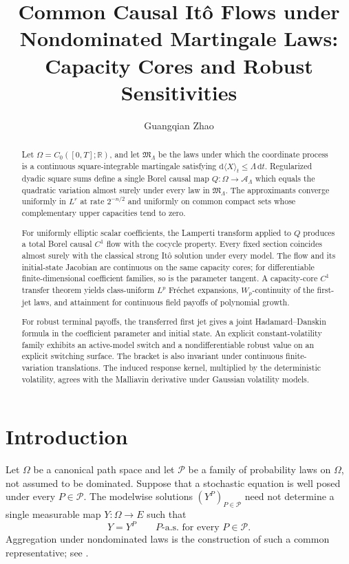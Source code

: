 \documentclass[11pt,reqno]{amsart}
\title[Common causal It\^o flows]
{Common Causal It\^o Flows under Nondominated Martingale Laws:\\
Capacity Cores and Robust Sensitivities}
\author{Guangqian Zhao}
\theoremstyle{plain}
\theoremstyle{definition}
\newcommand{\cP}{\mathcal P}
\begin{document}
\raggedbottom

\begin{abstract}
Let \(\Omega=C_0([0,T];\mathbb R)\), and let \(\mathfrak M_\Lambda\) be the
laws under which the coordinate process is a continuous square-integrable
martingale satisfying \(\mathrm d\langle X\rangle_t\leq
\Lambda\,\mathrm d t\).  Regularized dyadic square sums define a single
Borel causal map \(Q:\Omega\to\mathcal A_\Lambda\) which equals the
quadratic variation almost surely under every law in \(\mathfrak M_\Lambda\).
The approximants converge uniformly in \(L^r\) at rate \(2^{-n/2}\) and
uniformly on common compact sets whose complementary upper capacities tend
to zero.

For uniformly elliptic scalar coefficients, the Lamperti transform applied
to \(Q\) produces a total Borel causal \(C^1\) flow with the cocycle
property.  Every fixed section coincides almost surely with the classical
strong It\^o solution under every model.  The flow and its initial-state Jacobian
are continuous on the same capacity cores; for differentiable
finite-dimensional coefficient families, so is the parameter tangent.  A
capacity-core \(C^1\) transfer theorem yields class-uniform \(L^p\)
Fr\'echet expansions, \(W_p\)-continuity of the first-jet laws, and
attainment for continuous field payoffs of polynomial growth.

For robust terminal payoffs, the transferred first jet gives a joint
Hadamard--Danskin formula in the coefficient parameter and initial state.
An explicit constant-volatility family exhibits an active-model switch and
a nondifferentiable robust value on an explicit switching surface.
The bracket is also invariant under continuous finite-variation
translations.  The induced response kernel, multiplied by the deterministic
volatility, agrees with the Malliavin derivative under Gaussian volatility
models.
\end{abstract}

\maketitle

\section{Introduction}\label{sec:introduction}

Let \(\Omega\) be a canonical path space and let \(\cP\) be a family of
probability laws on \(\Omega\), not assumed to be dominated.  Suppose that a
stochastic equation is well posed under every \(P\in\cP\).  The modelwise
solutions \((Y^P)_{P\in\cP}\) need not determine a single measurable map
\(Y:\Omega\to E\) such that
\[
  Y=Y^P\qquad P\text{-a.s. for every }P\in\cP.
\]
Aggregation under nondominated laws is the construction of such a common
representative; see \cite{SonerTouziZhang11,Cohen12}.
\end{document}
